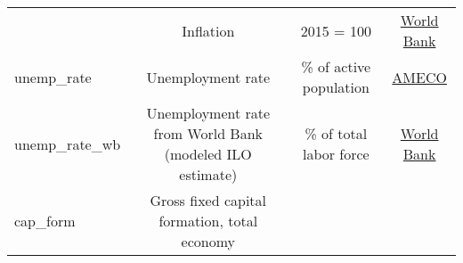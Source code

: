 \documentclass[]{article}
\begin{document}
\begin{longtable}[]{@{}lccc@{}}
\begin{minipage}[t]{0.14\columnwidth}
\end{minipage} & \begin{minipage}[t]{0.36\columnwidth}\centering\strut
Inflation\strut
\end{minipage} & \begin{minipage}[t]{0.24\columnwidth}\centering\strut
2015 = 100\strut
\end{minipage} & \begin{minipage}[t]{0.15\columnwidth}\centering\strut
\href{https://data.worldbank.org/indicator/FP.CPI.TOTL.ZG}{World
Bank}\strut
\end{minipage}\tabularnewline
\begin{minipage}[t]{0.14\columnwidth}\raggedright\strut
unemp\_rate\strut
\end{minipage} & \begin{minipage}[t]{0.36\columnwidth}\centering\strut
Unemployment rate\strut
\end{minipage} & \begin{minipage}[t]{0.24\columnwidth}\centering\strut
\% of active population\strut
\end{minipage} & \begin{minipage}[t]{0.15\columnwidth}\centering\strut
\href{https://ec.europa.eu/info/business-economy-euro/indicators-statistics/economic-databases/macro-economic-database-ameco/download-annual-data-set-macro-economic-database-ameco_en}{AMECO}\strut
\end{minipage}\tabularnewline
\begin{minipage}[t]{0.14\columnwidth}\raggedright\strut
unemp\_rate\_wb\strut
\end{minipage} & \begin{minipage}[t]{0.36\columnwidth}\centering\strut
Unemployment rate from World Bank (modeled ILO estimate)\strut
\end{minipage} & \begin{minipage}[t]{0.24\columnwidth}\centering\strut
\% of total labor force\strut
\end{minipage} & \begin{minipage}[t]{0.15\columnwidth}\centering\strut
\href{https://data.worldbank.org/indicator/SL.UEM.TOTL.ZS}{World
Bank}\strut
\end{minipage}\tabularnewline
\begin{minipage}[t]{0.14\columnwidth}\raggedright\strut
cap\_form\strut
\end{minipage} & \begin{minipage}[t]{0.36\columnwidth}\centering\strut
Gross fixed capital formation, total economy\strut

\end{minipage}
\end{longtable}
\end{document}

